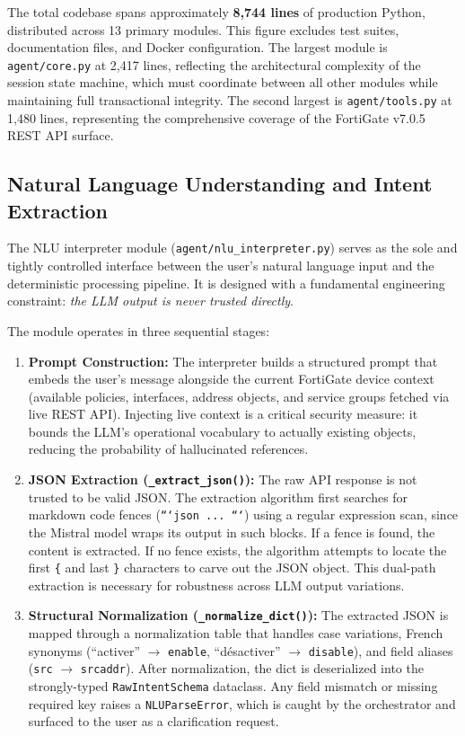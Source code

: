 The total codebase spans approximately \textbf{8,744 lines} of production Python, distributed across 13 primary modules. This figure excludes test suites, documentation files, and Docker configuration. The largest module is \texttt{agent/core.py} at 2,417 lines, reflecting the architectural complexity of the session state machine, which must coordinate between all other modules while maintaining full transactional integrity. The second largest is \texttt{agent/tools.py} at 1,480 lines, representing the comprehensive coverage of the FortiGate v7.0.5 REST API surface.

\subsection{Natural Language Understanding and Intent Extraction}
\label{subsec:nlu}

The NLU interpreter module (\texttt{agent/nlu\_interpreter.py}) serves as the sole and tightly controlled interface between the user's natural language input and the deterministic processing pipeline. It is designed with a fundamental engineering constraint: \emph{the LLM output is never trusted directly}.

The module operates in three sequential stages:

\begin{enumerate}
    \item \textbf{Prompt Construction:} The interpreter builds a structured prompt that embeds the user's message alongside the current FortiGate device context (available policies, interfaces, address objects, and service groups fetched via live REST API). Injecting live context is a critical security measure: it bounds the LLM's operational vocabulary to actually existing objects, reducing the probability of hallucinated references.
    \item \textbf{JSON Extraction (\texttt{\_extract\_json()}):} The raw API response is not trusted to be valid JSON. The extraction algorithm first searches for markdown code fences (\texttt{```json ... ```}) using a regular expression scan, since the Mistral model wraps its output in such blocks. If a fence is found, the content is extracted. If no fence exists, the algorithm attempts to locate the first \texttt{\{} and last \texttt{\}} characters to carve out the JSON object. This dual-path extraction is necessary for robustness across LLM output variations.
    \item \textbf{Structural Normalization (\texttt{\_normalize\_dict()}):} The extracted JSON is mapped through a normalization table that handles case variations, French synonyms (``activer'' $\to$ \texttt{enable}, ``désactiver'' $\to$ \texttt{disable}), and field aliases (\texttt{src} $\to$ \texttt{srcaddr}). After normalization, the dict is deserialized into the strongly-typed \texttt{RawIntentSchema} dataclass. Any field mismatch or missing required key raises a \texttt{NLUParseError}, which is caught by the orchestrator and surfaced to the user as a clarification request.
\end{enumerate}

